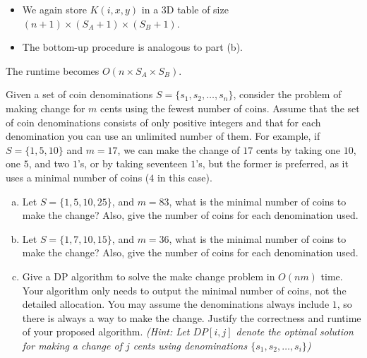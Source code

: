 \documentclass[11pt]{article}
\begin{document}
    \begin{itemize}
        \item We again store \(K(i,x,y)\) in a 3D table of size \((n+1) \times (S_A+1) \times (S_B+1)\).
        \item The bottom-up procedure is analogous to part (b).
    \end{itemize}
    The runtime becomes \(O(n \times S_A \times S_B)\).
    

    \newpage

    \begin{tcolorbox}[title={Problem 2 (Make Change, 50 points)}] \setlength\parindent{1em}
        
     Given a set of coin denominations $S=\{s_1, s_2,\dots, s_n\}$, consider the problem of making change for $m$ cents using the fewest
        number of coins. Assume that the set of coin denominations consists of only positive integers and that for each denomination you can use an unlimited number of them. For example, if $S=\{1, 5, 10\}$ and $m=17$, we can make the change of $17$ cents by taking one $10$, one $5$, and two $1$'s, or by taking seventeen $1$'s, but the former is preferred, as it uses a minimal number of coins ($4$ in this case).

    \begin{enumerate}[(a)]
    \item Let $S=\{1, 5, 10, 25\}$, and $m=83$, what is the minimal number of coins to make the change? Also, give the number of coins for each denomination used.
    \item Let $S=\{1, 7, 10, 15\}$, and $m=36$, what is the minimal number of coins to make the change? Also, give the number of coins for each denomination used.
    \item Give a DP algorithm to solve the make change problem in $O(nm)$ time. Your algorithm only needs to output the minimal number of coins, not the detailed allocation. You may assume the denominations always include $1$, so there is always a way to make the change. Justify the correctness and runtime of your proposed algorithm. \textit{(Hint: Let $DP[i,j]$ denote the optimal solution for making a change of $j$ cents using denominations $\{s_1, s_2, \dots, s_i\}$)}
    \end{enumerate}
    \end{tcolorbox}
    
    
    \newpage

    
    
\end{document}
